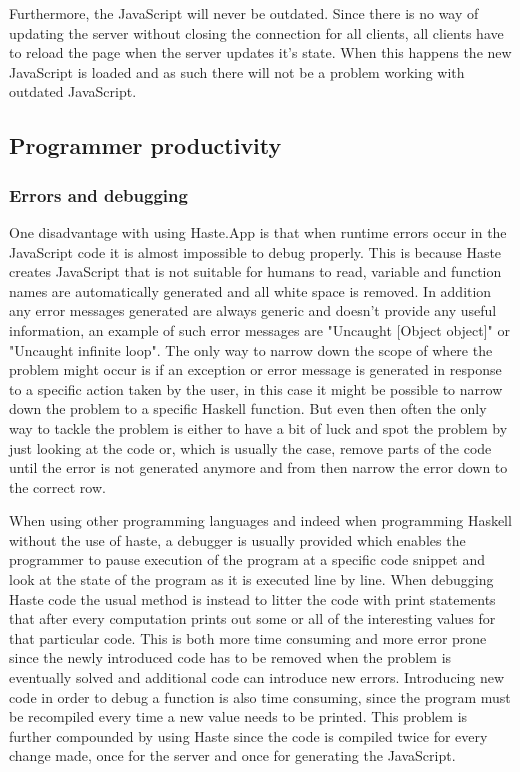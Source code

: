 \documentclass[a4paper]{article}
\begin{document}
Furthermore, the JavaScript will never be outdated. Since there is no way of updating the server without closing the connection for all clients, all clients have to reload the page when the server updates it's state. When this happens the new JavaScript is loaded and as such there will not be a problem working with outdated JavaScript.



\subsection{Programmer productivity}
\subsubsection{Errors and debugging} 
One disadvantage with using Haste.App is that when runtime errors occur in the JavaScript code it is almost impossible to debug properly. This is because Haste creates JavaScript that is not suitable for humans to read, variable and function names are automatically generated and all white space is removed. In addition any error messages generated are always generic and doesn't provide any useful information, an example of such error messages are "Uncaught [Object object]" or "Uncaught infinite loop". The only way to narrow down the scope of where the problem might occur is if an exception or error message is generated in response to a specific action taken by the user, in this case it might be possible to narrow down the problem to a specific Haskell function. But even then often the only way to tackle the problem is either to have a bit of luck and spot the problem by just looking at the code or, which is usually the case, remove parts of the code until the error is not generated anymore and from then narrow the error down to the correct row.

When using other programming languages and indeed when programming Haskell without the use of haste, a debugger is usually provided which enables the programmer to pause execution of the program at a specific code snippet and look at the state of the program as it is executed line by line. When debugging Haste code the usual method is instead to litter the code with print statements that after every computation prints out some or all of the interesting values for that particular code. This is both more time consuming and more error prone since the newly introduced code has to be removed when the problem is eventually solved and additional code can introduce new errors. Introducing new code in order to debug a function is also time consuming, since the program must be recompiled every time a new value needs to be printed. This problem is further compounded by using Haste since the code is compiled twice for every change made, once for the server and once for generating the JavaScript.
\end{document}
